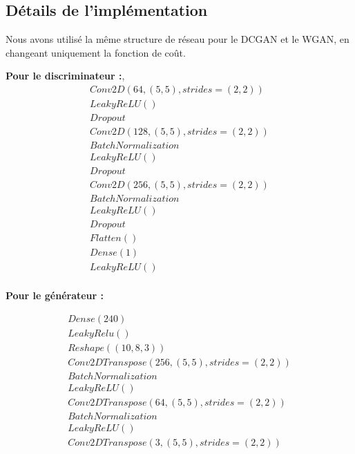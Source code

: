 \subsection{Détails de l'implémentation}

Nous avons utilisé la même structure de réseau pour le DCGAN et le WGAN, en changeant uniquement la fonction de coût.


\textbf{Pour le discriminateur :},
\[ \begin{array}{lcr}
Conv2D(64, (5,5), strides=(2,2)) \\
LeakyReLU() \\
Dropout\\

Conv2D(128, (5,5), strides=(2,2)) \\
BatchNormalization\\
LeakyReLU()\\
Dropout\\

Conv2D(256, (5,5), strides=(2,2)) \\
BatchNormalization\\
LeakyReLU()\\
Dropout\\


Flatten()\\
Dense(1)\\
LeakyReLU()\\

\end{array}\]

\textbf{Pour le générateur :} 

\[ \begin{array}{lcr}
Dense(240)\\
LeakyRelu()\\
Reshape((10, 8, 3))\\

Conv2DTranspose(256, (5,5), strides=(2,2)) \\
BatchNormalization\\
LeakyReLU() \\


Conv2DTranspose(64, (5,5), strides=(2,2)) \\
BatchNormalization\\
LeakyReLU() \\

Conv2DTranspose(3, (5,5), strides=(2,2)) \\

\end{array}\]

